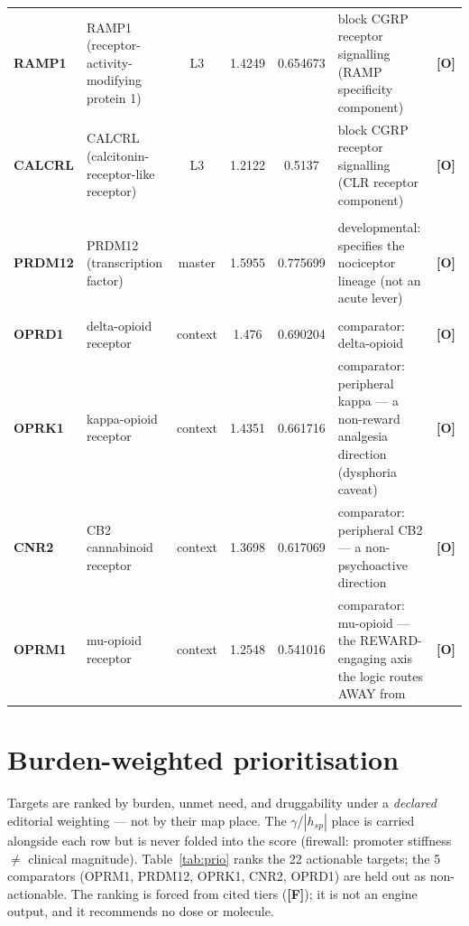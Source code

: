 \documentclass[11pt]{article}
\newcommand{\gF}{\textcolor{gf}{\textbf{[F]}}}
\newcommand{\gO}{\textcolor{go}{\textbf{[O]}}}
\begin{document}
\begin{footnotesize}
\begin{longtable}{@{}>{\raggedright\arraybackslash}p{1.55cm}>{\raggedright\arraybackslash}p{1.7cm}cS[table-format=1.4]S[table-format=1.6]>{\raggedright\arraybackslash}p{3.7cm}c@{}}
\textbf{RAMP1} & RAMP1 (receptor-activity-modifying protein 1) & L3 & 1.4249 & 0.654673 & \footnotesize block CGRP receptor signalling (RAMP specificity component) & \gO{}\\
\textbf{CALCRL} & CALCRL (calcitonin-receptor-like receptor) & L3 & 1.2122 & 0.5137 & \footnotesize block CGRP receptor signalling (CLR receptor component) & \gO{}\\
\\
\textbf{PRDM12} & PRDM12 (transcription factor) & master & 1.5955 & 0.775699 & \footnotesize developmental: specifies the nociceptor lineage (not an acute lever) & \gO{}\\
\\
\textbf{OPRD1} & delta-opioid receptor & context & 1.476 & 0.690204 & \footnotesize comparator: delta-opioid & \gO{}\\
\textbf{OPRK1} & kappa-opioid receptor & context & 1.4351 & 0.661716 & \footnotesize comparator: peripheral kappa --- a non-reward analgesia direction (dysphoria caveat) & \gO{}\\
\textbf{CNR2} & CB2 cannabinoid receptor & context & 1.3698 & 0.617069 & \footnotesize comparator: peripheral CB2 --- a non-psychoactive direction & \gO{}\\
\textbf{OPRM1} & mu-opioid receptor & context & 1.2548 & 0.541016 & \footnotesize comparator: mu-opioid --- the REWARD-engaging axis the logic routes AWAY from & \gO{}\\
\end{longtable}
\end{footnotesize}

\section{Burden-weighted prioritisation}
Targets are ranked by burden, unmet need, and druggability under a \emph{declared} editorial weighting --- not by their map place. The $\gamma$/$|h_{sp}|$ place is carried alongside each row but is never folded into the score (firewall: promoter stiffness $\neq$ clinical magnitude). Table~\ref{tab:prio} ranks the 22 actionable targets; the 5 comparators (OPRM1, PRDM12, OPRK1, CNR2, OPRD1) are held out as non-actionable. The ranking is forced from cited tiers (\gF{}); it is not an engine output, and it recommends no dose or molecule.
\end{document}
